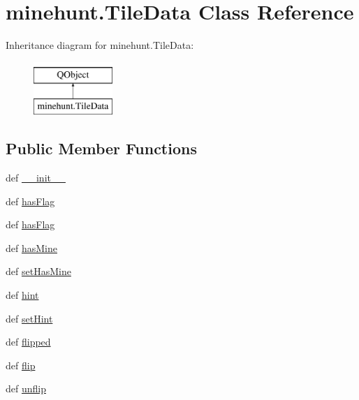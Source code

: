 \hypertarget{classminehunt_1_1TileData}{}\section{minehunt.\+Tile\+Data Class Reference}
\label{classminehunt_1_1TileData}
Inheritance diagram for minehunt.\+Tile\+Data\+:\begin{figure}[H]
\begin{center}
\leavevmode
\includegraphics[height=2.000000cm]{classminehunt_1_1TileData}
\end{center}
\end{figure}
\subsection*{Public Member Functions}
\begin{DoxyCompactItemize}
\item 
def \hyperlink{classminehunt_1_1TileData_aac36a22d48eb1cc42738d6d0fb5ef872}{\+\_\+\+\_\+init\+\_\+\+\_\+}
\item 
def \hyperlink{classminehunt_1_1TileData_a6510e7b7086170b6fce1bfd49c238c7f}{has\+Flag}
\item 
def \hyperlink{classminehunt_1_1TileData_a6510e7b7086170b6fce1bfd49c238c7f}{has\+Flag}
\item 
def \hyperlink{classminehunt_1_1TileData_a374f22e99f4b6d55c887d9a15a9b721f}{has\+Mine}
\item 
def \hyperlink{classminehunt_1_1TileData_a66c131b058f54c91856ae91915c648d6}{set\+Has\+Mine}
\item 
def \hyperlink{classminehunt_1_1TileData_ad68839a70e3b7ee9eaf70c8b1760b1d7}{hint}
\item 
def \hyperlink{classminehunt_1_1TileData_a75f4aeddd6af1c43502c81dcb14b7806}{set\+Hint}
\item 
def \hyperlink{classminehunt_1_1TileData_ab343524f0be7b9607ed5a8586c697768}{flipped}
\item 
def \hyperlink{classminehunt_1_1TileData_a45f0c4dc8ce0e653f9bd165fd84ee477}{flip}
\item 
def \hyperlink{classminehunt_1_1TileData_a8d89ec57776b2dcbdbb195f61d2e1855}{unflip}
\end{DoxyCompactItemize}
